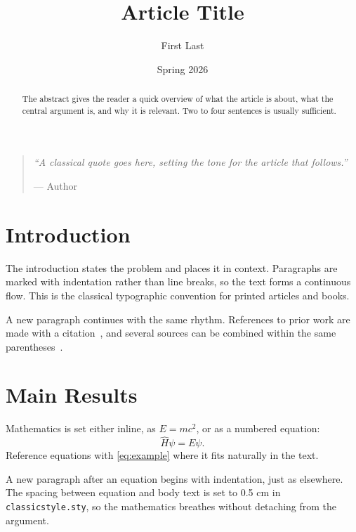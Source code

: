 \documentclass[12pt]{article}
\title{\huge Article Title}
\author{\small First Last}
\date{Spring 2026}
\begin{document}
{\selectfont\maketitle}     %
\vspace{1cm}

\begin{quote}
  \emph{``A classical quote goes here, setting the tone for the
  article that follows.''}
  \begin{flushright}
    --- Author
  \end{flushright}
\end{quote}

\begin{abstract}
  \noindent The abstract gives the reader a quick overview of what
  the article is about, what the central argument is, and why it is
  relevant. Two to four sentences is usually sufficient.
\end{abstract}

\newpage


\section{Introduction}

The introduction states the problem and places it in context.
Paragraphs are marked with indentation rather than line breaks,
so the text forms a continuous flow. This is the classical
typographic convention for printed articles and books.

A new paragraph continues with the same rhythm. References to prior
work are made with a citation~\cite{example2024}, and several sources
can be combined within the same parentheses~\cite{example2024,examplebook2020}.


\section{Main Results}

Mathematics is set either inline, as $E = mc^2$, or as a numbered
equation:
\begin{equation}
  \hat{H}\psi = E\psi.
  \label{eq:example}
\end{equation}
Reference equations with \eqref{eq:example} where it fits naturally
in the text.

A new paragraph after an equation begins with indentation, just as
elsewhere. The spacing between equation and body text is set to
0.5 cm in \texttt{classicstyle.sty}, so the mathematics breathes
without detaching from the argument.
\end{document}
